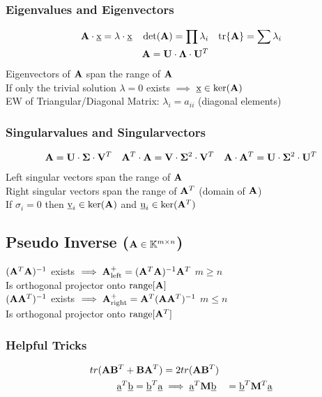 \begin{mdframed}[style=eqbox]
\subsubsection{Eigenvalues and Eigenvectors}
\begin{align*}
  \mathbf{A} \cdot \underbar{x} = \lambda \cdot \underbar{x} && \det(\mathbf{A}) = \prod \lambda_i && \text{tr}\{\mathbf{A}\} = \sum \lambda_i\\
  &&\mathbf{A} = \mathbf{U} \cdot \mathbf{\Lambda} \cdot \mathbf{U}^{T}&&
\end{align*}
Eigenvectors of $\mathbf{A}$ span the range of $\mathbf{A}$\\
If only the trivial solution $\lambda = 0$ exists $\implies$ $\underbar{x} \in \text{ker}(\mathbf{A})$\\[0.25em]
EW of Triangular/Diagonal Matrix: $\lambda_i = a_{ii}$ (diagonal elements)

\subsubsection{Singularvalues and Singularvectors}
\begin{align*}
  \mathbf{A} = \mathbf{U} \cdot \mathbf{\Sigma} \cdot \mathbf{V}^{T} && \mathbf{A}^{T} \cdot \mathbf{A} = \mathbf{V} \cdot \mathbf{\Sigma}^{2} \cdot \mathbf{V}^{T} && \mathbf{A} \cdot \mathbf{A}^{T} = \mathbf{U} \cdot \mathbf{\Sigma}^{2} \cdot \mathbf{U}^{T}
\end{align*}
Left singular vectors span the range of $\mathbf{A}$\\
Right singular vectors span the range of $\mathbf{A}^{T}$ (domain of $\mathbf{A}$)\\
If $\sigma_i = 0$ then $\underbar{v}_i \in \text{ker}(\mathbf{A})$ and $\underbar{u}_i \in \text{ker}(\mathbf{A}^{T})$

\subsection{Pseudo Inverse ($\mathbf{A} \in \mathbb{K}^{m \times n}$)}
$(\mathbf{A}^T\mathbf{A})^{-1}$ exists $\implies \mathbf{A}^+_{\text{left}} = (\mathbf{A}^T\mathbf{A})^{-1}\mathbf{A}^T$ $m \geq n$\\
Is orthogonal projector onto $\text{range}[\mathbf{A}]$ \\[0.25em]
$(\mathbf{A}\mathbf{A}^T)^{-1}$ exists $\implies \mathbf{A}^+_{\text{right}} = \mathbf{A}^T(\mathbf{A}\mathbf{A}^T)^{-1}$ $m \leq n$\\
Is orthogonal projector onto $\text{range}[\mathbf{A}^T]$

\subsubsection{Helpful Tricks}
\vspace*{-10pt}
\begin{align*}
  tr(\mathbf{A}\mathbf{B}^T + \mathbf{B}\mathbf{A}^T) &= 2tr(\mathbf{A}\mathbf{B}^T)\\
  \underbar{a}^T\underbar{b} = \underbar{b}^T\underbar{a} &\implies \underbar{a}^T \mathbf{M} \underbar{b} &= \underbar{b}^T \mathbf{M}^T \underbar{a}
\end{align*}
\end{mdframed}